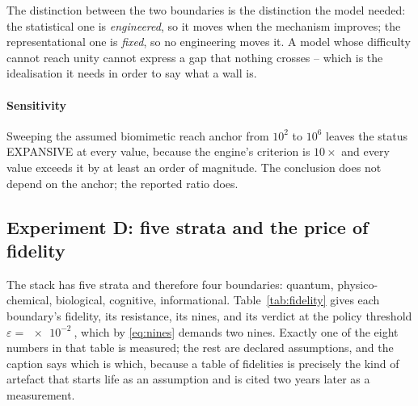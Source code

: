 \documentclass[conference]{IEEEtran}
\theoremstyle{definition}
\begin{document}
The distinction between the two boundaries is the distinction the model needed:
the statistical one is \emph{engineered}, so it moves when the mechanism improves;
the representational one is \emph{fixed}, so no engineering moves it. A model whose
difficulty cannot reach unity cannot express a gap that nothing crosses -- which is
the idealisation it needs in order to say what a wall is.

\begin{table}[t]
\centering
\caption{The representational boundary. From $1-D=10^{-9}$ no narrower opening can
be expressed: the crossing still passes, no rung is spawned, and the row is marked
terminal.}
\label{tab:structural}
\footnotesize

\end{table}

\paragraph{Sensitivity} Sweeping the assumed biomimetic reach anchor from $10^{2}$
to $10^{6}$ leaves the status EXPANSIVE at every value, because the engine's
criterion is $10\times$ and every value exceeds it by at least an order of
magnitude. The conclusion does not depend on the anchor; the reported ratio does.

\subsection{Experiment D: five strata and the price of fidelity}
\label{sec:topology}

The stack has five strata and therefore four boundaries: quantum,
physico-chemical, biological, cognitive, informational. Table~\ref{tab:fidelity}
gives each boundary's fidelity, its resistance, its nines, and its verdict at the
policy threshold $\varepsilon=\SI{e-2}{}$, which by \eqref{eq:nines} demands two
nines. Exactly one of the eight numbers in that table is measured; the rest are
declared assumptions, and the caption says which is which, because a table of
fidelities is precisely the kind of artefact that starts life as an assumption and
is cited two years later as a measurement.

\begin{table}[t]
\centering
\caption{Fidelity of the four boundaries, per function, at
$\varepsilon=\SI{e-2}{}$ (two nines required). Only the first row's routing
fidelity is measured; the others are assumptions; see
Section~\ref{sec:threats}.}
\label{tab:fidelity}
\footnotesize

\end{table}
\end{document}
